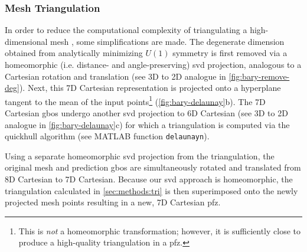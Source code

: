 \documentclass[preprint,12pt]{elsarticle}
\begin{document}
\subsubsection{Mesh Triangulation}
In order to reduce the computational complexity of triangulating a high-dimensional mesh \cite{barberQuickhullAlgorithmConvex1996}, some simplifications are made. The degenerate dimension obtained from analytically minimizing $U(1)$ symmetry \cite{francisGeodesicOctonionMetric2019} is first removed via a homeomorphic (i.e. distance- and angle-preserving) \gls{svd} projection,
analogous to a Cartesian rotation and translation
(see 3D to 2D analogue in \cref{fig:bary-remove-deg}). Next, this 7D Cartesian representation is projected onto a hyperplane tangent to the mean of the input points\footnote{This is \textit{not} a homeomorphic transformation; however, it is sufficiently close to produce a high-quality triangulation in a \gls{pfz}.} (\cref{fig:bary-delaunay}b). The 7D Cartesian \glspl{gbo} undergo another \gls{svd} projection to 6D Cartesian (see 3D to 2D analogue in \cref{fig:bary-delaunay}c) for which a triangulation is computed via the quickhull algorithm \cite{barberQuickhullAlgorithmConvex1996} (see MATLAB function \texttt{delaunayn}).

Using a separate homeomorphic \gls{svd} projection from the triangulation, the original mesh and prediction \glspl{gbo} are simultaneously rotated and translated from 8D Cartesian to 7D Cartesian. Because our \gls{svd} approach is homeomorphic, the triangulation calculated in \cref{sec:methods:tri} is then superimposed onto the newly projected mesh points resulting in a new, 7D Cartesian \gls{pfz}.
\end{document}
